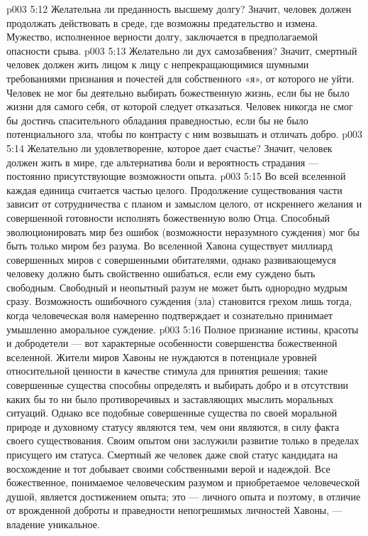 \vs p003 5:12 \bibnobreakspace Желательна ли  преданность высшему долгу? Значит, человек должен продолжать действовать в среде, где возможны предательство и измена. Мужество, исполненное верности долгу, заключается в предполагаемой опасности срыва.
\vs p003 5:13 \bibnobreakspace Желательно ли  дух самозабвения? Значит, смертный человек должен жить лицом к лицу с непрекращающимися шумными требованиями признания и почестей для собственного «я», от которого не уйти. Человек не мог бы деятельно выбирать божественную жизнь, если бы не было жизни для самого себя, от которой следует отказаться. Человек никогда не смог бы достичь спасительного обладания праведностью, если бы не было потенциального зла, чтобы по контрасту с ним возвышать и отличать добро.
\vs p003 5:14 \bibnobreakspace Желательно ли  удовлетворение, которое дает счастье? Значит, человек должен жить в мире, где альтернатива боли и вероятность страдания --- постоянно присутствующие возможности опыта.
\vs p003 5:15 \pc Во всей вселенной каждая единица считается частью целого. Продолжение существования части зависит от сотрудничества с планом и замыслом целого, от искреннего желания и совершенной готовности исполнять божественную волю Отца. Способный эволюционировать мир без ошибок (возможности неразумного суждения) мог бы быть только миром без  разума. Во вселенной Хавона существует миллиард совершенных миров с совершенными обитателями, однако развивающемуся человеку должно быть свойственно ошибаться, если ему суждено быть свободным. Свободный и неопытный разум не может быть однородно мудрым сразу. Возможность ошибочного суждения (зла) становится грехом лишь тогда, когда человеческая воля намеренно подтверждает и сознательно принимает умышленно аморальное суждение.
\vs p003 5:16 \pc Полное признание истины, красоты и добродетели --- вот характерные особенности совершенства божественной вселенной. Жители миров Хавоны не нуждаются в потенциале уровней относительной ценности в качестве стимула для принятия решения; такие совершенные существа способны определять и выбирать добро и в отсутствии каких бы то ни было противоречивых и заставляющих мыслить моральных ситуаций. Однако все подобные совершенные существа по своей моральной природе и духовному статусу являются тем, чем они являются, в силу факта своего существования. Своим опытом они заслужили развитие только в пределах присущего им статуса. Смертный же человек даже свой статус кандидата на восхождение и тот добывает своими собственными верой и надеждой. Все божественное, понимаемое человеческим разумом и приобретаемое человеческой душой, является достижением опыта; это ---  личного опыта и поэтому, в отличие от врожденной доброты и праведности непогрешимых личностей Хавоны, --- владение уникальное.
